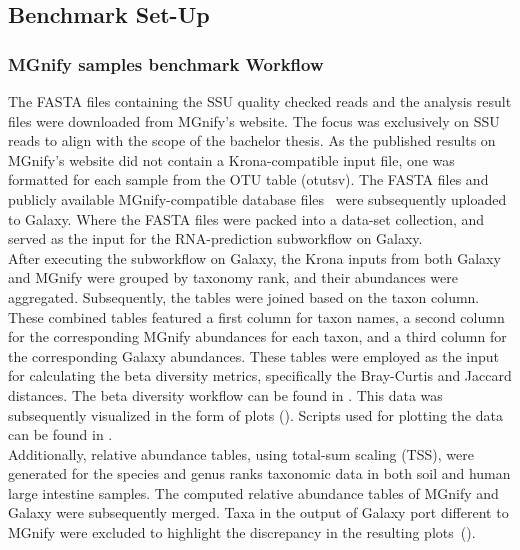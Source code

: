 \subsection{Benchmark Set-Up}\label{subsec:Benchmark-Set-Up}

\subsubsection{MGnify samples benchmark Workflow}\label{subsubsec:Benchmark-Workflow-mgnify}
The FASTA files containing the SSU quality checked reads and the analysis result files were downloaded from MGnify's website. The focus was exclusively on SSU reads to align with the scope of the bachelor thesis. As the published results on MGnify's website did not contain a Krona-compatible input file, one was formatted for each sample from the OTU table (otu\textunderscore tsv).
The FASTA files and publicly available MGnify-compatible database files~\cite{noauthor_index_nodate} were subsequently uploaded to Galaxy. Where the FASTA files were packed into a data-set collection, and served as the input for the RNA-prediction subworkflow on Galaxy.\\
After executing the subworkflow on Galaxy, the Krona inputs from both Galaxy and MGnify were grouped by taxonomy rank, and their abundances were aggregated. Subsequently, the tables were joined based on the taxon column. These combined tables featured a first column for taxon names, a second column for the corresponding MGnify abundances for each taxon, and a third column for the corresponding Galaxy abundances. These tables were employed as the input for calculating the beta diversity metrics, specifically the Bray-Curtis and Jaccard distances. The beta diversity workflow can be found in . This data was subsequently visualized in the form of plots (). Scripts used for plotting the data can be found in .\\
Additionally, relative abundance tables, using total-sum scaling (TSS), were generated for the species and genus ranks taxonomic data in both soil and human large intestine samples. The computed relative abundance tables of MGnify and Galaxy were subsequently merged. Taxa in the output of Galaxy port different to MGnify were excluded to highlight the discrepancy in the resulting plots~().\\
